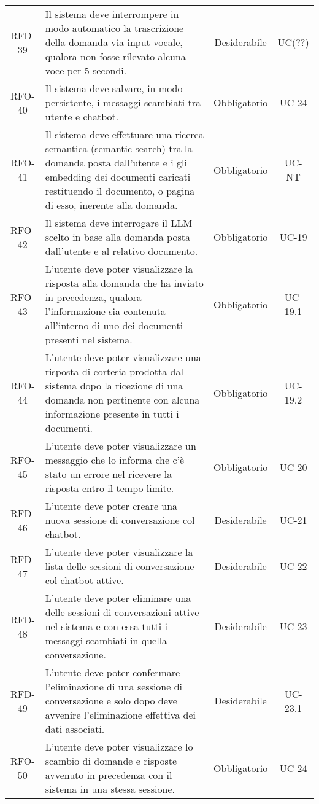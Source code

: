 \begin{xltabular}{\textwidth}{| c | X | c | c |}
    \hline
    RFD-39 & Il sistema deve interrompere in modo automatico la trascrizione della domanda via input vocale, qualora non fosse rilevato alcuna voce per 5 secondi. & Desiderabile & UC(??)\\
    RFO-40 & Il sistema deve salvare, in modo persistente, i messaggi scambiati tra utente e chatbot. & Obbligatorio & UC-24\\
    \hline
    RFO-41 & Il sistema deve effettuare una ricerca semantica (semantic search) tra la domanda posta dall'utente e i gli embedding dei documenti caricati restituendo il documento, o pagina di esso, inerente alla domanda. & Obbligatorio & UC-NT\\
    \hline
    RFO-42 & Il sistema deve interrogare il LLM scelto in base alla domanda posta dall'utente e al relativo documento. & Obbligatorio & UC-19\\
    \hline
    RFO-43 & L’utente deve poter visualizzare la risposta alla domanda che ha inviato in precedenza, qualora l'informazione sia contenuta all'interno di uno dei documenti presenti nel sistema. & Obbligatorio & UC-19.1 \\
    \hline
    RFO-44 & L’utente deve poter visualizzare una risposta di cortesia prodotta dal sistema dopo la ricezione di una domanda non pertinente con alcuna informazione presente in tutti i documenti. & Obbligatorio & UC-19.2 \\
    \hline
    RFO-45 & L'utente deve poter visualizzare un messaggio che lo informa che c'è stato un errore nel ricevere la risposta entro il tempo limite. & Obbligatorio & UC-20 \\
    \hline
    RFD-46 & L’utente deve poter creare una nuova sessione di conversazione col chatbot. & Desiderabile & UC-21 \\
    \hline
    RFD-47 & L’utente deve poter visualizzare la lista delle sessioni di conversazione col chatbot attive. & Desiderabile & UC-22 \\
    \hline
    RFD-48 & L’utente deve poter eliminare una delle sessioni di conversazioni attive nel sistema e con essa tutti i messaggi scambiati in quella conversazione. & Desiderabile & UC-23 \\
    \hline
    RFD-49 & L’utente deve poter confermare l’eliminazione di una sessione di conversazione e solo dopo deve avvenire l'eliminazione effettiva dei dati associati. & Desiderabile & UC-23.1 \\
    \hline
    RFO-50 & L’utente deve poter visualizzare lo scambio di domande e risposte avvenuto in precedenza con il sistema in una stessa sessione. & Obbligatorio & UC-24 \\

\end{xltabular}
